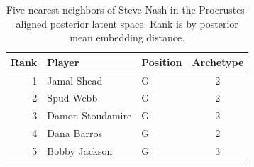 \begin{table}[htbp]
  \centering\small
  \begin{tabular}{rllc}
    \toprule
    Rank & Player & Position & Archetype \\
    \midrule
    1 & Jamal Shead & G & 2 \\
    2 & Spud Webb & G & 2 \\
    3 & Damon Stoudamire & G & 2 \\
    4 & Dana Barros & G & 2 \\
    5 & Bobby Jackson & G & 3 \\
    \bottomrule
  \end{tabular}
  \caption{Five nearest neighbors of Steve Nash in the Procrustes-aligned posterior latent space. Rank is by posterior mean embedding distance.}
  \label{tab:Steve_Nash_neighbors}
\end{table}

